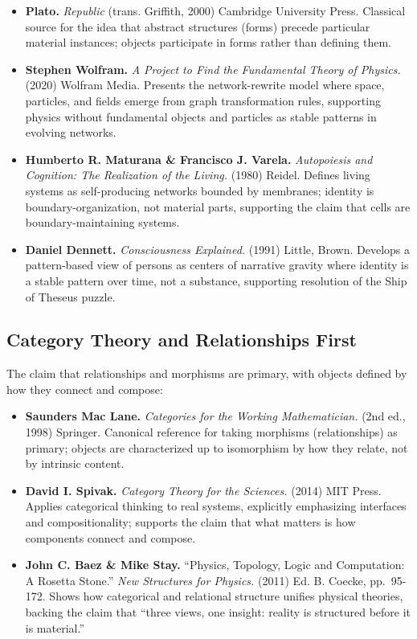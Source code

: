 \documentclass[
  openright]{book}
\begin{document}
\begin{itemize}
\item
  \textbf{Plato.} \emph{Republic} (trans. Griffith, 2000) Cambridge
  University Press. Classical source for the idea that abstract
  structures (forms) precede particular material instances; objects
  participate in forms rather than defining them.
\item
  \textbf{Stephen Wolfram.} \emph{A Project to Find the Fundamental
  Theory of Physics.} (2020) Wolfram Media. Presents the network-rewrite
  model where space, particles, and fields emerge from graph
  transformation rules, supporting physics without fundamental objects
  and particles as stable patterns in evolving networks.
\item
  \textbf{Humberto R. Maturana \& Francisco J. Varela.}
  \emph{Autopoiesis and Cognition: The Realization of the Living.}
  (1980) Reidel. Defines living systems as self-producing networks
  bounded by membranes; identity is boundary-organization, not material
  parts, supporting the claim that cells are boundary-maintaining
  systems.
\item
  \textbf{Daniel Dennett.} \emph{Consciousness Explained.} (1991)
  Little, Brown. Develops a pattern-based view of persons as centers of
  narrative gravity where identity is a stable pattern over time, not a
  substance, supporting resolution of the Ship of Theseus puzzle.
\end{itemize}

\subsection{Category Theory and Relationships
First}\label{category-theory-and-relationships-first}

The claim that relationships and morphisms are primary, with objects
defined by how they connect and compose:

\begin{itemize}
\item
  \textbf{Saunders Mac Lane.} \emph{Categories for the Working
  Mathematician.} (2nd ed., 1998) Springer. Canonical reference for
  taking morphisms (relationships) as primary; objects are characterized
  up to isomorphism by how they relate, not by intrinsic content.
\item
  \textbf{David I. Spivak.} \emph{Category Theory for the Sciences.}
  (2014) MIT Press. Applies categorical thinking to real systems,
  explicitly emphasizing interfaces and compositionality; supports the
  claim that what matters is how components connect and compose.
\item
  \textbf{John C. Baez \& Mike Stay.} ``Physics, Topology, Logic and
  Computation: A Rosetta Stone.'' \emph{New Structures for Physics.}
  (2011) Ed. B. Coecke, pp.~95-172. Shows how categorical and relational
  structure unifies physical theories, backing the claim that ``three
  views, one insight: reality is structured before it is material.''
\end{itemize}
\end{document}
